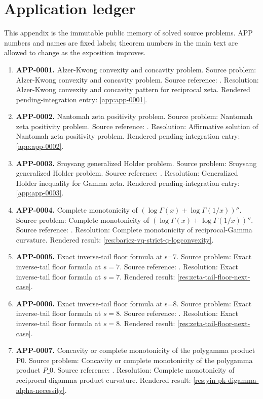 \section{Application ledger}
This appendix is the immutable public memory of solved source problems.  APP numbers and names are fixed labels; theorem numbers in the main text are allowed to change as the exposition improves.
\begin{enumerate}[leftmargin=*]
\item \textbf{APP-0001.} Alzer-Kwong convexity and concavity problem.  Source problem: Alzer-Kwong convexity and concavity problem. Source reference: \cite{app-app-0001-source}. Resolution: Alzer-Kwong convexity and concavity pattern for reciprocal zeta. Rendered pending-integration entry: \ref{app:app-0001}.
\item \textbf{APP-0002.} Nantomah zeta positivity problem.  Source problem: Nantomah zeta positivity problem. Source reference: \cite{nantomah}. Resolution: Affirmative solution of Nantomah zeta positivity problem. Rendered pending-integration entry: \ref{app:app-0002}.
\item \textbf{APP-0003.} Sroysang generalized Holder problem.  Source problem: Sroysang generalized Holder problem. Source reference: \cite{sroysang}. Resolution: Generalized Holder inequality for Gamma zeta. Rendered pending-integration entry: \ref{app:app-0003}.
\item \textbf{APP-0004.} Complete monotonicity of \((\log\Gamma(x)+\log\Gamma(1/x))''\).  Source problem: Complete monotonicity of \((\log\Gamma(x)+\log\Gamma(1/x))''\). Source reference: \cite{app-app-0004-source}. Resolution: Complete monotonicity of reciprocal-Gamma curvature. Rendered result: \ref{res:baricz-vq-strict-q-logconvexity}.
\item \textbf{APP-0005.} Exact inverse-tail floor formula at s=7.  Source problem: Exact inverse-tail floor formula at \(s=7\). Source reference: \cite{kim-song-tail}. Resolution: Exact inverse-tail floor formula at \(s=7\). Rendered result: \ref{res:zeta-tail-floor-next-case}.
\item \textbf{APP-0006.} Exact inverse-tail floor formula at s=8.  Source problem: Exact inverse-tail floor formula at \(s=8\). Source reference: \cite{kim-song-tail}. Resolution: Exact inverse-tail floor formula at \(s=8\). Rendered result: \ref{res:zeta-tail-floor-next-case}.
\item \textbf{APP-0007.} Concavity or complete monotonicity of the polygamma product P0.  Source problem: Concavity or complete monotonicity of the polygamma product \(P\_0\). Source reference: \cite{app-app-0004-source}. Resolution: Complete monotonicity of reciprocal digamma product curvature. Rendered result: \ref{res:yin-pk-digamma-alpha-necessity}.

\end{enumerate}
